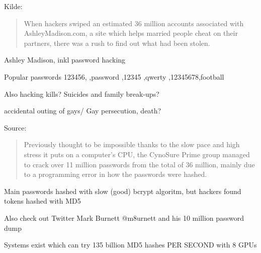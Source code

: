 \documentclass[20pt,landscape,a4paper,footrule]{foils}
\begin{document}
\vskip 1cm
Kilde:






\begin{quote}
When hackers swiped an estimated 36 million accounts associated with AshleyMadison.com, a site which helps married people cheat on their partners, there was a rush to find out what had been stolen.
\end{quote}


\begin{list2}
\item Ashley Madison, inkl password hacking
\item Popular passwords
123456,
,password
,12345
,qwerty
,12345678,football
\item Also hacking kills? Suicides and family break-ups?
\item accidental outing of gays/ Gay persecution, death?
\end{list2}

Source:\\
{\footnotesize{}}


\begin{quote}
Previously thought to be impossible thanks to the slow pace and high stress it puts on a computer's CPU, the CynoSure Prime group managed to crack over 11 million passwords from the total of 36 million, mainly due to a programming error in how the passwords were hashed.
\end{quote}


\begin{list2}
\item Main passwords hashed with slow (good) bcrypt  algoritm, but hackers found tokens hashed with MD5\\
\item Also check out Twitter Mark Burnett @m8urnett and his 10 million password dump\\
\item Systems exist which can try 135 billion MD5 hashes PER SECOND with 8 GPUs
\end{list2}
\end{document}
